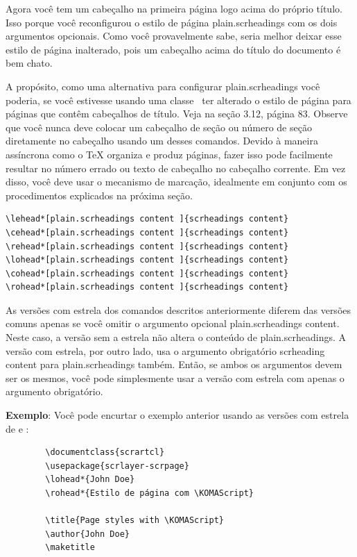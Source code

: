 Agora você tem um cabeçalho na primeira página logo acima do próprio título. Isso porque você reconfigurou o estilo de página plain.scrheadings com os dois argumentos opcionais. Como você provavelmente sabe, seria melhor deixar esse estilo de página inalterado, pois um cabeçalho acima do título do documento é bem chato.

A propósito, como uma alternativa para configurar plain.scrheadings você poderia, se você estivesse usando uma classe \KOMAScript\ ter alterado o estilo de página para páginas que contêm cabeçalhos de título. Veja  na seção 3.12, página 83.
Observe que você nunca deve colocar um cabeçalho de seção ou número de seção diretamente no cabeçalho usando um desses comandos. Devido à maneira assíncrona como o TeX organiza e produz páginas, fazer isso pode facilmente resultar no número errado ou texto de cabeçalho no cabeçalho corrente. Em vez disso, você deve usar o mecanismo de marcação, idealmente em conjunto com os procedimentos explicados na próxima seção.
\begin{verbatim}
\lehead*[plain.scrheadings content ]{scrheadings content}
\cehead*[plain.scrheadings content ]{scrheadings content}
\rehead*[plain.scrheadings content ]{scrheadings content}
\lohead*[plain.scrheadings content ]{scrheadings content}
\cohead*[plain.scrheadings content ]{scrheadings content}
\rohead*[plain.scrheadings content ]{scrheadings content}
\end{verbatim}

As versões com estrela dos comandos descritos anteriormente diferem das versões comuns apenas se você omitir o argumento opcional plain.scrheadings content. Neste caso, a versão sem a estrela não altera o conteúdo de plain.scrheadings. A versão com estrela, por outro lado, usa o argumento obrigatório scrheading content para plain.scrheadings também. Então, se ambos os argumentos devem ser os mesmos, você pode simplesmente usar a versão com estrela com apenas o argumento obrigatório.

\textbf{Exemplo}: Você pode encurtar o exemplo anterior usando as versões com estrela de  e :
\begin{verbatim}
        \documentclass{scrartcl}
        \usepackage{scrlayer-scrpage}
        \lohead*{John Doe}
        \rohead*{Estilo de página com \KOMAScript}
        
        \title{Page styles with \KOMAScript}
        \author{John Doe}
        \maketitle
         
\end{verbatim}

